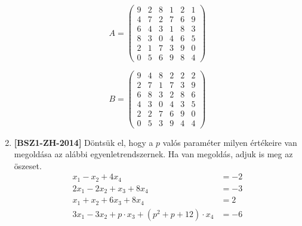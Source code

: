 \documentclass[a4paper, 12pt]{article}
\begin{document}
\begin{enumerate}
\begin{figure}[h!]
\begin{subfigure}{0.4\textwidth}
                    \centering
                    \[
                        A = \left(\begin{array}{cccccc}
                            9 & 2 & 8 & 1 & 2 & 1 \\
                            4 & 7 & 2 & 7 & 6 & 9 \\
                            6 & 4 & 3 & 1 & 8 & 3 \\
                            8 & 3 & 0 & 4 & 6 & 5 \\
                            2 & 1 & 7 & 3 & 9 & 0 \\
                            0 & 5 & 6 & 9 & 8 & 4 
                        \end{array}\right)    
                    \]
                \end{subfigure}
                \begin{subfigure}{0.4\textwidth}
                    \centering
                    \[
                        B = \left(\begin{array}{cccccc}
                            9 & 4 & 8 & 2 & 2 & 2 \\
                            2 & 7 & 1 & 7 & 3 & 9 \\
                            6 & 8 & 3 & 2 & 8 & 6 \\
                            4 & 3 & 0 & 4 & 3 & 5 \\
                            2 & 2 & 7 & 6 & 9 & 0 \\
                            0 & 5 & 3 & 9 & 4 & 4 
                        \end{array}\right)    
                    \]
                \end{subfigure}
            \end{figure}
            \item \textbf{[BSZ1-ZH-2014]} Döntsük el, hogy a $p$ valós paraméter milyen értékeire van megoldása az alábbi egyenletrendszernek. Ha van megoldás, adjuk is meg az öszeset.
            \begin{align*}
                x_1 - x_2 + 4x_4 &= -2 \\
                2x_1 - 2x_2 + x_3 + 8x_4 &= -3 \\
                x_1 + x_2 + 6x_3 + 8x_4 &= 2 \\
                3x_1 - 3x_2 + p \cdot x_3 + (p^2 + p + 12)\cdot x_4 &= -6
            \end{align*}
        \end{enumerate}
    
\end{document}
